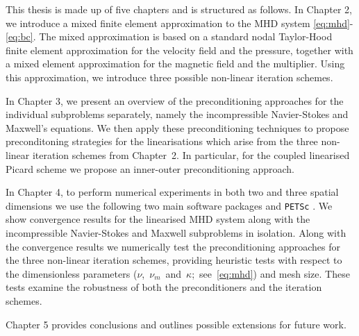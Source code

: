 This thesis is made up of five chapters and is structured as follows. In Chapter 2, we introduce a mixed finite element approximation to the MHD system \eqref{eq:mhd}-\eqref{eq:bc}. The mixed approximation is based on a standard nodal Taylor-Hood finite element approximation for the velocity field and the pressure, together with a mixed \nedelec element approximation for the magnetic field and the multiplier. Using this approximation, we introduce three possible non-linear iteration schemes.

In Chapter 3, we present an overview of the preconditioning approaches for the individual subproblems separately, namely the incompressible Navier-Stokes and Maxwell's equations. We then apply these preconditioning techniques to propose preconditoning strategies for the linearisations which arise from the three non-linear iteration schemes from Chapter~2. In particular, for the coupled linearised Picard scheme we propose an inner-outer preconditioning approach.

In Chapter 4, to perform numerical experiments in both two and three spatial dimensions we use the following two main software packages \fenics \cite{wells2012automated} and {\tt PETSc} \cite{petsc-web-page,petsc-user-ref}. We show convergence results for the linearised MHD system along with the incompressible Navier-Stokes and Maxwell subproblems in isolation. Along with the convergence results we numerically test the preconditioning approaches for the three non-linear iteration schemes, providing heuristic tests with respect to the dimensionless parameters ($\nu$,~$\nu_m$~and~$\kappa$;~see~\eqref{eq:mhd}) and mesh size. These tests examine the robustness of both the preconditioners and the iteration schemes.

Chapter 5 provides conclusions and outlines possible extensions for future work.
